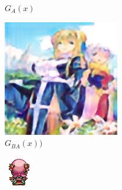 \documentclass{beamer}
\begin{document}
\begin{frame}
\begin{figure}[htb]
\begin{subfigure}[b]{0.23\linewidth}
        \caption{$G_A(x)$}
      \end{subfigure}
      \begin{subfigure}[b]{0.23\linewidth}
        \includegraphics[width=\linewidth]{exp7_epoch061_rec_A.png}
        \caption{$G_{BA}(x))$}
      \end{subfigure}
      \begin{subfigure}[b]{0.23\linewidth}
        \includegraphics[width=\linewidth]{exp7_epoch061_idt_A.png}

\end{subfigure}
\end{figure}
\end{frame}
\end{document}
